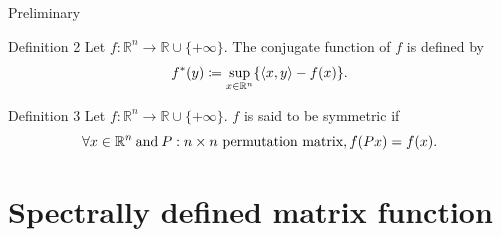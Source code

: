 \documentclass[aspectratio=169, dvipdfmx, 11pt]{beamer}
\newcommand{\RealNumberSet}{\mathbb{R}}
\newcommand{\NDemenstionalRealEuclideanSpace}{\mathbb{R}^n}
\newcommand{\InnerProduct}[2]{\left\langle {#1},{#2}\right\rangle} %
\newcommand{\ExtendedRealValuedFunction}[2]{{#1}: {#2} \to \RealNumberSet \cup \{+\infty\}}
\newcommand{\ConjugateFunction}[1]{{#1}^*}
\begin{document}
\begin{frame}{Preliminary}
  \begin{block}{Definition 2}
    Let $\ExtendedRealValuedFunction{f}{\NDemenstionalRealEuclideanSpace}$.
    The conjugate function of $f$ is defined by
    \begin{equation}
      \ConjugateFunction{f}(y) \coloneqq \sup_{x \in \NDemenstionalRealEuclideanSpace} \{ \InnerProduct{x}{y} - f(x) \}. \notag
    \end{equation}
  \end{block}

  \begin{block}{Definition 3}
    Let $\ExtendedRealValuedFunction{f}{\NDemenstionalRealEuclideanSpace}$.
    $f$ is said to be symmetric if
    \begin{equation}
      \forall x \in \NDemenstionalRealEuclideanSpace \:\text{and}\: P: n \times n \text{ permutation matrix}, f(Px) = f(x). \notag
    \end{equation}
  \end{block}
\end{frame}

\section{Spectrally defined matrix function}
\end{document}
